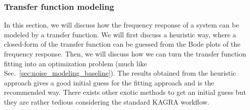 \subsubsection{Transfer function modeling \label{sec:transfer_function_modeling}}
In this section, we will discuss how the frequency response of a system can be modeled by a transfer function.
We will first discuss a heuristic way, where a closed-form of the transfer function can be guessed from the Bode plots of the frequency response.
Then, we will discuss how we can turn the transfer function fitting into an optimization problem (much like Sec.~\ref{sec:noise_modeling_baseline}).
The results obtained from the heuristic approach gives a good initial guess for the fitting approach and is the recommended way.
There exists other exotic methods to get an initial guess but they are rather tedious considering the standard KAGRA workflow.

